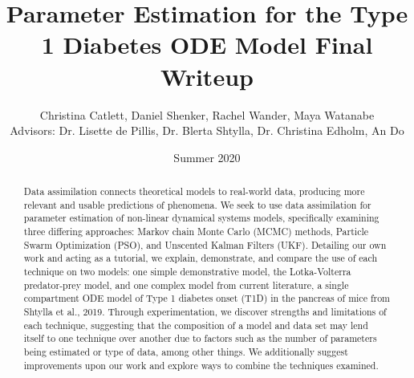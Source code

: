 \documentclass{article}
\title{Parameter Estimation for the Type 1 Diabetes ODE Model Final Writeup}
\author{Christina Catlett, Daniel Shenker, Rachel Wander, Maya Watanabe\\{\small Advisors: Dr. Lisette de Pillis, Dr. Blerta Shtylla, Dr. Christina Edholm, An Do}}
\date{Summer 2020}
\begin{document}
\maketitle
\begin{abstract}
Data assimilation connects theoretical models to real-world data, producing more relevant and usable predictions of phenomena. We seek to use data assimilation for parameter estimation of non-linear dynamical systems models, specifically examining three differing approaches: Markov chain Monte Carlo (MCMC) methods, Particle Swarm Optimization (PSO), and Unscented Kalman Filters (UKF). Detailing our own work and acting as a tutorial, we explain, demonstrate, and compare the use of each technique on two models: one simple demonstrative model, the Lotka-Volterra predator-prey model, and one complex model from current literature, a single compartment ODE model of Type 1 diabetes onset (T1D) in the pancreas of mice from Shtylla et al., 2019. Through experimentation, we discover strengths and limitations of each technique, suggesting that the composition of a model and data set may lend itself to one technique over another due to factors such as the number of parameters being estimated or type of data, among other things. We additionally suggest improvements upon our work and explore ways to combine the techniques examined. 
\end{abstract}
\tableofcontents






















\end{document}
